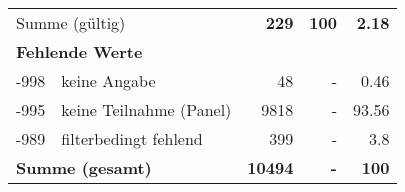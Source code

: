 \begin{longtable}{lXrrr}
     \midrule
     \multicolumn{2}{l}{Summe (gültig)} &
       \textbf{\num{229}} &
     \textbf{\num{100}} &
       \textbf{\num[round-mode=places,round-precision=2]{2.18}} \\
     \multicolumn{5}{l}{\textbf{Fehlende Werte}}\\
       -998 &
       keine Angabe &
         \num{48} &
        - &
         \num[round-mode=places,round-precision=2]{0.46} \\
       -995 &
       keine Teilnahme (Panel) &
         \num{9818} &
        - &
         \num[round-mode=places,round-precision=2]{93.56} \\
       -989 &
       filterbedingt fehlend &
         \num{399} &
        - &
         \num[round-mode=places,round-precision=2]{3.8} \\
     \midrule
     \multicolumn{2}{l}{\textbf{Summe (gesamt)}} &
          \textbf{\num{10494}} &
        \textbf{-} &
        \textbf{\num{100}} \\
     \bottomrule
     \end{longtable}
     
